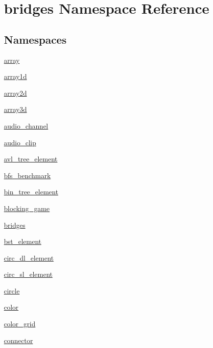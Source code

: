 \hypertarget{namespacebridges}{}\section{bridges Namespace Reference}
\label{namespacebridges}
\subsection*{Namespaces}
\begin{DoxyCompactItemize}
\item 
 \mbox{\hyperlink{namespacebridges_1_1array}{array}}
\item 
 \mbox{\hyperlink{namespacebridges_1_1array1d}{array1d}}
\item 
 \mbox{\hyperlink{namespacebridges_1_1array2d}{array2d}}
\item 
 \mbox{\hyperlink{namespacebridges_1_1array3d}{array3d}}
\item 
 \mbox{\hyperlink{namespacebridges_1_1audio__channel}{audio\+\_\+channel}}
\item 
 \mbox{\hyperlink{namespacebridges_1_1audio__clip}{audio\+\_\+clip}}
\item 
 \mbox{\hyperlink{namespacebridges_1_1avl__tree__element}{avl\+\_\+tree\+\_\+element}}
\item 
 \mbox{\hyperlink{namespacebridges_1_1bfs__benchmark}{bfs\+\_\+benchmark}}
\item 
 \mbox{\hyperlink{namespacebridges_1_1bin__tree__element}{bin\+\_\+tree\+\_\+element}}
\item 
 \mbox{\hyperlink{namespacebridges_1_1blocking__game}{blocking\+\_\+game}}
\item 
 \mbox{\hyperlink{namespacebridges_1_1bridges}{bridges}}
\item 
 \mbox{\hyperlink{namespacebridges_1_1bst__element}{bst\+\_\+element}}
\item 
 \mbox{\hyperlink{namespacebridges_1_1circ__dl__element}{circ\+\_\+dl\+\_\+element}}
\item 
 \mbox{\hyperlink{namespacebridges_1_1circ__sl__element}{circ\+\_\+sl\+\_\+element}}
\item 
 \mbox{\hyperlink{namespacebridges_1_1circle}{circle}}
\item 
 \mbox{\hyperlink{namespacebridges_1_1color}{color}}
\item 
 \mbox{\hyperlink{namespacebridges_1_1color__grid}{color\+\_\+grid}}
\item 
 \mbox{\hyperlink{namespacebridges_1_1connector}{connector}}

\end{DoxyCompactItemize}
